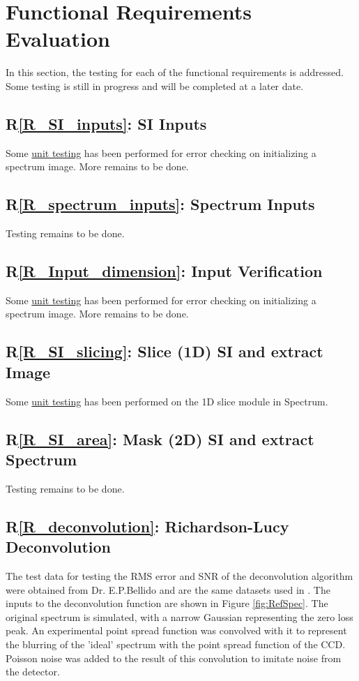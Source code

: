 \documentclass[12pt, titlepage]{article}
\newcommand{\rref}[1]{R\ref{#1}}
\begin{document}
\section{Functional Requirements Evaluation}
In this section, the testing for each of the functional requirements is
addressed. Some testing is still in progress and will be completed at a later
date.
\subsection{\rref{R_SI_inputs}: SI Inputs}
Some \hyperref[sec:UnitTest]{unit testing} has been performed for error checking
on initializing a spectrum image. More remains to be done.

\subsection{\rref{R_spectrum_inputs}: Spectrum Inputs}
Testing remains to be done.

\subsection{\rref{R_Input_dimension}: Input Verification}
Some \hyperref[sec:UnitTest]{unit testing} has been performed for error checking
on initializing a spectrum image. More remains to be done.

\subsection{\rref{R_SI_slicing}: Slice (1D) SI and extract Image}
Some \hyperref[sec:UnitTest]{unit testing} has been performed on the 1D slice
module in Spectrum.

\subsection{\rref{R_SI_area}: Mask (2D) SI and extract Spectrum}
Testing remains to be done.

\subsection{\rref{R_deconvolution}: Richardson-Lucy Deconvolution}
The test data for testing the RMS error and SNR of the deconvolution algorithm
were obtained from Dr. E.P.Bellido and are the same datasets used in
\cite{bellido_toward_2014}. The inputs to the deconvolution function are shown
in Figure \ref{fig:RefSpec}. The original spectrum is simulated, with a narrow
Gaussian representing the zero loss peak. An experimental point spread function
was convolved with it to represent the blurring of the 'ideal' spectrum with the
point spread function of the CCD. Poisson noise was added to the result of this
convolution to imitate noise from the detector.
\end{document}

